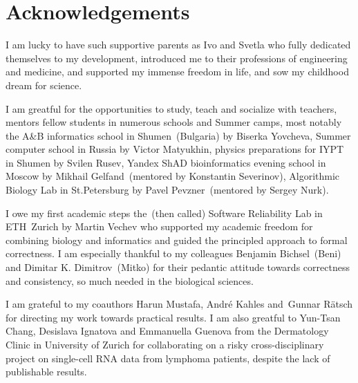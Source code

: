 
\bigskip

\begingroup
\let\clearpage\relax
\let\cleardoublepage\relax
\let\cleardoublepage\relax
\chapter*{Acknowledgements}

\def\thanks#1{%
\begingroup
\leftskip1em
\noindent #1
\par
\endgroup
}

I am lucky to have such supportive parents as Ivo and Svetla who fully dedicated
themselves to my development, introduced me to their professions of engineering
and medicine, and supported my immense freedom in life, and sow my childhood
dream for science.

I am greatful for the opportunities to study, teach and socialize with teachers,
mentors fellow students in numerous schools and Summer camps, most notably the
A\&B informatics school in Shumen~(Bulgaria) by Biserka Yovcheva, Summer
computer school in Russia by Victor Matyukhin, physics preparations for IYPT in
Shumen by Svilen Rusev, Yandex ShAD bioinformatics evening school in Moscow by
Mikhail Gelfand~(mentored by Konstantin Severinov), Algorithmic Biology Lab in
St.Petersburg by Pavel Pevzner~(mentored by Sergey Nurk).

I owe my first academic steps the~(then called) Software Reliability Lab in
ETH~Zurich by Martin Vechev who supported my academic freedom for combining
biology and informatics and guided the principled approach to formal
correctness. I am especially thankful to my colleagues Benjamin Bichsel~(Beni)
and Dimitar K. Dimitrov~(Mitko) for their pedantic attitude towards correctness
and consistency, so much needed in the biological sciences.

I am grateful to my coauthors Harun Mustafa, André Kahles and Gunnar Rätsch for
directing my \A work towards practical results. I am also greatful to Yun-Tsan
Chang, Desislava Ignatova and Emmanuella Guenova from the Dermatology Clinic in
University of Zurich for collaborating on a risky cross-disciplinary project on
single-cell RNA data from lymphoma patients, despite the lack of publishable
results.

